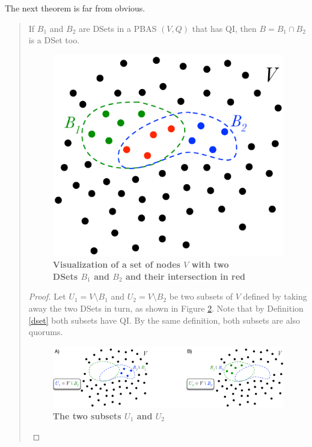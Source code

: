 The next theorem is far from obvious.
\begin{quote}
\small
\begin{theorem}
\label{theorem2}
If $B_1$ and $B_2$ are DSets in a PBAS $(V, Q)$ that has QI, then $B = B_1 \cap B_2$ is a DSet too.
\end{theorem}

\begin{figure}[h]
\centering
\includegraphics[width=5 cm]{Figures/Thm2_V}
\caption{\bf \small Visualization of a set of nodes $V$ with two\\ DSets $B_1$ and $B_2$ and their intersection in red}
\label{fig:Thm2_V}
\vspace{-0.5cm}
\end{figure}

\begin{proof}
Let $U_1 = V \setminus B_1$ and $U_2 = V \setminus B_2$ be two subsets of $V$ defined by taking away the two DSets in turn, as shown in Figure \ref{fig:Thm2_U1_U2}. Note that by Definition \ref{dset} both subsets have QI. By the same definition, both subsets are also quorums.

\begin{figure}[h]
\centering
\includegraphics[width=16 cm]{Figures/Thm2_U1_U2}
\caption{\bf \small The two subsets $U_1$ and $U_2$}
\label{fig:Thm2_U1_U2}
\vspace{-0.4cm}
\end{figure}


\end{proof}
\end{quote}
